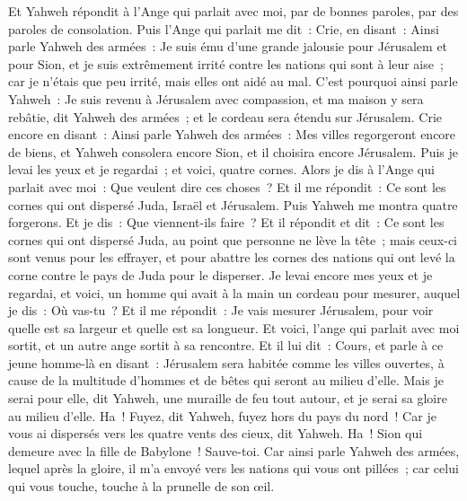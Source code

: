 \begin{multicols}{2}
Et Yahweh répondit à l'Ange qui parlait avec moi, par de bonnes paroles, par des paroles de consolation.
Puis l'Ange qui parlait me dit~: Crie, en disant~: Ainsi parle Yahweh des armées~: Je suis ému d'une grande jalousie pour Jérusalem et pour Sion,
et je suis extrêmement irrité contre les nations qui sont à leur aise~; car je n'étais que peu irrité, mais elles ont aidé au mal.
C'est pourquoi ainsi parle Yahweh~: Je suis revenu à Jérusalem avec compassion, et ma maison y sera rebâtie, dit Yahweh des armées~; et le cordeau sera étendu sur Jérusalem.
Crie encore en disant~: Ainsi parle Yahweh des armées~: Mes villes regorgeront encore de biens, et Yahweh consolera encore Sion, et il choisira encore Jérusalem.
Puis je levai les yeux et je regardai~; et voici, quatre cornes.
Alors je dis à l'Ange qui parlait avec moi~: Que veulent dire ces choses~? Et il me répondit~: Ce sont les cornes qui ont dispersé Juda, Israël et Jérusalem.
Puis Yahweh me montra quatre forgerons.
Et je dis~: Que viennent-ils faire~? Et il répondit et dit~: Ce sont les cornes qui ont dispersé Juda, au point que personne ne lève la tête~; mais ceux-ci sont venus pour les effrayer, et pour abattre les cornes des nations qui ont levé la corne contre le pays de Juda pour le disperser.
\VerseOne{}Je levai encore mes yeux et je regardai, et voici, un homme qui avait à la main un cordeau pour mesurer,
auquel je dis~: Où vas-tu~? Et il me répondit~: Je vais mesurer Jérusalem, pour voir quelle est sa largeur et quelle est sa longueur.
Et voici, l'ange qui parlait avec moi sortit, et un autre ange sortit à sa rencontre.
Et il lui dit~: Cours, et parle à ce jeune homme-là en disant~: Jérusalem sera habitée comme les villes ouvertes, à cause de la multitude d'hommes et de bêtes qui seront au milieu d'elle.
Mais je serai pour elle, dit Yahweh, une muraille de feu tout autour, et je serai sa gloire au milieu d'elle.
Ha~! Fuyez, dit Yahweh, fuyez hors du pays du nord~! Car je vous ai dispersés vers les quatre vents des cieux, dit Yahweh.
Ha~! Sion qui demeure avec la fille de Babylone~! Sauve-toi.
Car ainsi parle Yahweh des armées, lequel après la gloire, il m'a envoyé vers les nations qui vous ont pillées~; car celui qui vous touche, touche à la prunelle de son œil.

\end{multicols}
